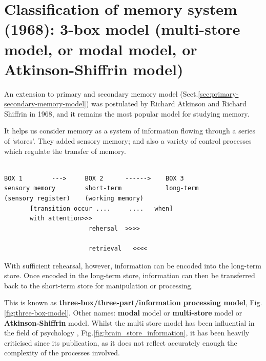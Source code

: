 \section{Classification of memory system (1968): 3-box model (multi-store model,
or modal model, or Atkinson-Shiffrin model)}
\label{sec:3-box-memory-model}
\label{sec:Atkinson-Shiffrin-model}

An extension to primary and secondary memory model
(Sect.\ref{sec:primary-secondary-memory-model}) was postulated by Richard
Atkinson and Richard Shiffrin in 1968, and it remains the most
popular model for studying memory. 

It helps us consider memory as a system of information flowing through a series
of ‘stores’. They added sensory memory; and also a variety of control processes
which regulate the transfer of memory.
\begin{verbatim}

BOX 1        --->     BOX 2      ------>    BOX 3
sensory memory        short-term            long-term
(sensory register)    (working memory)
       [transition occur ....     ....   when]
       with attention>>>
                       rehersal  >>>>
                       
                       retrieval   <<<<
\end{verbatim}
With sufficient rehearsal, however, information can be encoded into the
long-term store. Once encoded in the long-term store, information can then be
transferred back to the short-term store for manipulation or processing.



This is known as {\bf three-box/three-part/information processing model},
Fig.\ref{fig:three-box-model}. Other names: {\bf modal} model or {\bf
multi-store} model or {\bf Atkinson-Shiffrin} model.
Whilst the multi store model has been influential in the field of psychology
\citep{anderson2000}, Fig.\ref{fig:brain_store_information}, it has been heavily
criticised since its publication, as it does not reflect accurately enough the
complexity of the processes involved.



